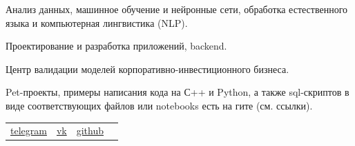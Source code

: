 \documentclass[a4paper,12pt]{memoir} %
\begin{document}


{
Анализ данных, машинное обучение и нейронные сети, обработка естественного языка и компьютерная лингвистика (NLP).
}


{
Проектирование и разработка приложений, backend.
}


\Sep %



{
Центр валидации моделей корпоративно-инвестиционного бизнеса. 
}

{
Pet-проекты, примеры написания кода на С++ и Python, а также sql-скриптов в виде соответствующих файлов или notebooks есть на гите (см. ссылки). 
}

\Sep %




{\begin{tabular}{p{} p{} p{} p{}}
\href{ https://t.me/vladfoxin666}{telegram} &  
\href{ https://vk.com/vladlisin02}{vk} &
 \href{ https://github.com/vladislavlisin}{github} &
\end{tabular}}







\Sep %

\end{document}
